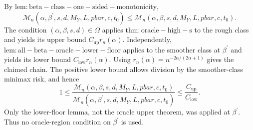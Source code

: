 By \(\mathrm{lem:beta-class-one-sided-monotonicity}\),
\[
\mathcal M_n(\alpha,\beta^{\prime},s,d,M_Y,L,pbar,c,t_0)
\le
\mathcal M_n(\alpha,\beta,s,d,M_Y,L,pbar,c,t_0).
\]
The condition \((\alpha,\beta,s,d)\in\Omega\) applies \(\mathrm{thm:oracle-high-s}\) to the rough class and yields its upper bound \(C_{\mathrm{up}}r_n(\alpha)\).  Independently, \(\mathrm{lem:all-beta-oracle-lower-floor}\) applies to the smoother class at \(\beta^{\prime}\) and yields its lower bound \(C_{\mathrm{low}}r_n(\alpha)\).  Using \(r_n(\alpha)=n^{-2\alpha/(2\alpha+1)}\) gives the claimed chain.  The positive lower bound allows division by the smoother-class minimax risk, and hence
\[
1\le
\frac{\mathcal M_n(\alpha,\beta,s,d,M_Y,L,pbar,c,t_0)}
{\mathcal M_n(\alpha,\beta^{\prime},s,d,M_Y,L,pbar,c,t_0)}
\le\frac{C_{\mathrm{up}}}{C_{\mathrm{low}}}.
\]
Only the lower-floor lemma, not the oracle upper theorem, was applied at \(\beta^{\prime}\).  Thus no oracle-region condition on \(\beta^{\prime}\) is used.